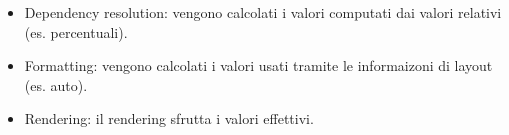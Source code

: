 \begin{itemize}
    \item Dependency resolution: vengono calcolati i valori computati dai valori relativi (es. percentuali).
    \item Formatting: vengono calcolati i valori usati tramite le informaizoni di layout (es. auto).
    \item Rendering: il rendering sfrutta i valori effettivi.
\end{itemize}